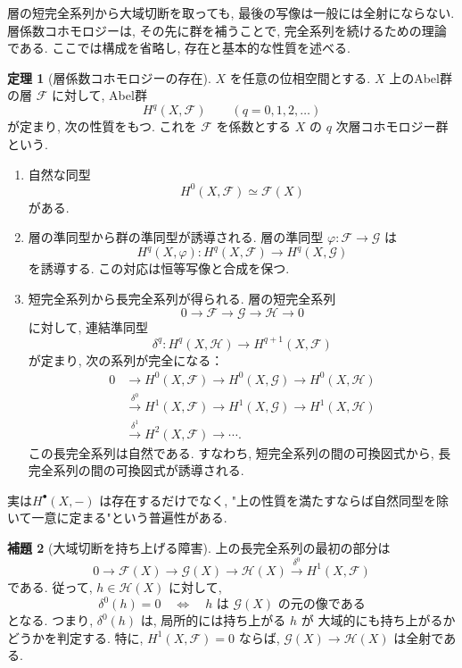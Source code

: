 \documentclass[dvipdfmx,a4paper,11pt]{article} %
\theoremstyle{definition}
\newtheorem{thm}{定理}[section]
\numberwithin{equation}{section}
\newtheorem{lem}[thm]{補題}
\begin{document}
層の短完全系列から大域切断を取っても, 
最後の写像は一般には全射にならない.
層係数コホモロジーは, その先に群を補うことで, 
完全系列を続けるための理論である.
ここでは構成を省略し, 存在と基本的な性質を述べる.

\begin{thm}[層係数コホモロジーの存在]
\label{O-M234}
$X$ を任意の位相空間とする.
$X$ 上のAbel群の層 $\mathcal F$ に対して, 
Abel群
\[
H^q(X,\mathcal F)\qquad(q=0,1,2,\ldots)
\]
が定まり, 次の性質をもつ.
これを $\mathcal F$ を係数とする
$X$ の $q$ 次層コホモロジー群という.

\begin{enumerate}
\item

自然な同型
\[
H^0(X,\mathcal F)\simeq\mathcal F(X)
\]
がある.

\item

層の準同型から群の準同型が誘導される.
層の準同型 $\varphi:\mathcal F\to\mathcal G$ は
\[
H^q(X,\varphi):
H^q(X,\mathcal F)\longrightarrow H^q(X,\mathcal G)
\]
を誘導する.
この対応は恒等写像と合成を保つ.

\item

短完全系列から長完全系列が得られる.
層の短完全系列
\[
0\longrightarrow\mathcal F
\longrightarrow\mathcal G
\longrightarrow\mathcal H
\longrightarrow0
\]
に対して, 連結準同型
\[
\delta^q:H^q(X,\mathcal H)
\longrightarrow H^{q+1}(X,\mathcal F)
\]
が定まり, 次の系列が完全になる：
\[
\begin{aligned}
0&\longrightarrow H^0(X,\mathcal F)
\longrightarrow H^0(X,\mathcal G)
\longrightarrow H^0(X,\mathcal H)\\
&\xrightarrow{\delta^0}H^1(X,\mathcal F)
\longrightarrow H^1(X,\mathcal G)
\longrightarrow H^1(X,\mathcal H)\\
&\xrightarrow{\delta^1}H^2(X,\mathcal F)
\longrightarrow\cdots.
\end{aligned}
\]
この長完全系列は自然である.
すなわち, 短完全系列の間の可換図式から, 
長完全系列の間の可換図式が誘導される.
\end{enumerate}
\end{thm}

実は$H^\bullet(X,-)$ は存在するだけでなく, "上の性質を満たすならば自然同型を除いて一意に定まる"という普遍性がある. 

\begin{lem}[大域切断を持ち上げる障害]


上の長完全系列の最初の部分は
\[
0\longrightarrow\mathcal F(X)
\longrightarrow\mathcal G(X)
\longrightarrow\mathcal H(X)
\xrightarrow{\delta^0}H^1(X,\mathcal F)
\]
である.
従って, $h\in\mathcal H(X)$ に対して, 
\[
\delta^0(h)=0
\quad\Longleftrightarrow\quad
h\text{ は }\mathcal G(X)\text{ の元の像である}
\]
となる.
つまり, $\delta^0(h)$ は, 
局所的には持ち上がる $h$ が
大域的にも持ち上がるかどうかを判定する.
特に, $H^1(X,\mathcal F)=0$ ならば, 
$\mathcal G(X)\to\mathcal H(X)$ は全射である.
\end{lem}
\end{document}
